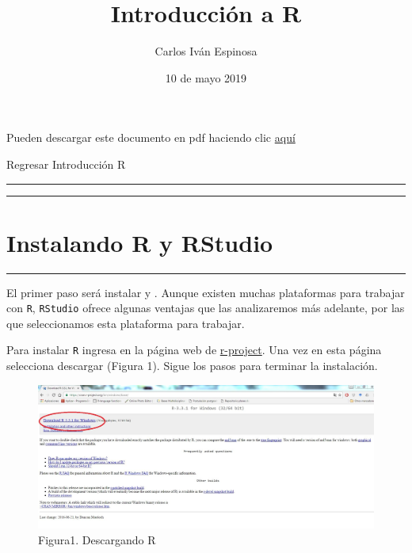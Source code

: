 \documentclass[]{article}
\title{Introducción a R}
\author{Carlos Iván Espinosa}
\date{10 de mayo 2019}
\begin{document}
\maketitle

{
\setcounter{tocdepth}{2}
\tableofcontents
}
Pueden descargar este documento en pdf haciendo clic
\href{https://github.com/Ciespinosa/IntroduccionR/blob/master/index.pdf}{aquí}

Regresar Introducción R

\begin{center}\rule{0.5\linewidth}{\linethickness}\end{center}

\begin{center}\rule{0.5\linewidth}{\linethickness}\end{center}

\section{Instalando R y RStudio}\label{instalando-r-y-rstudio}

\begin{center}\rule{0.5\linewidth}{\linethickness}\end{center}

El primer paso será instalar y . Aunque existen muchas plataformas para
trabajar con \texttt{R}, \texttt{RStudio} ofrece algunas ventajas que
las analizaremos más adelante, por las que seleccionamos esta plataforma
para trabajar.

Para instalar \texttt{R} ingresa en la página web de
\href{https://cran.r-project.org/bin/windows/base/}{r-project}. Una vez
en esta página selecciona descargar (Figura 1). Sigue los pasos para
terminar la instalación.

\begin{figure}[htbp]
\centering
\includegraphics{imagen/descargarR.jpg}
\caption{Figura1. Descargando R}
\end{figure}
\end{document}
